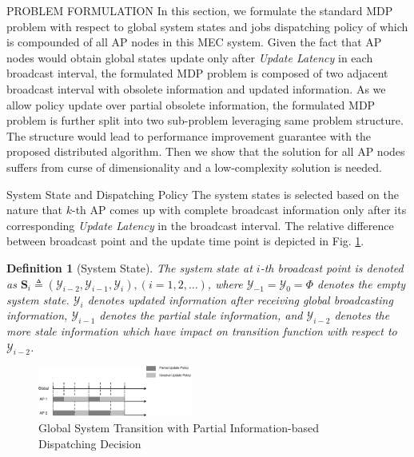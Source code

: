 \documentclass[10pt, conference, letterpaper]{IEEEtran}
\newtheorem{definition}{Definition}
\newcommand{\define}{\triangleq}
\newcommand{\Stat}{\mathbf{S}}
\newcommand{\Obsv}{\mathcal{Y}}
\begin{document}
    \begin{section}{PROBLEM FORMULATION}
        \label{sec:formulation}
        In this section, we formulate the standard MDP problem with respect to global system states and jobs dispatching policy of which is compounded of all AP nodes in this MEC system.
        Given the fact that AP nodes would obtain global states update only after \emph{Update Latency} in each broadcast interval, the formulated MDP problem is composed of two adjacent broadcast interval with obsolete information and updated information.
        As we allow policy update over partial obsolete information, the formulated MDP problem is further split into two sub-problem leveraging same problem structure. The structure would lead to performance improvement guarantee with the proposed distributed algorithm.
        Then we show that the solution for all AP nodes suffers from curse of dimensionality and a low-complexity solution is needed.

        \begin{subsection}{System State and Dispatching Policy}
            The system states is selected based on the nature that $k$-th AP comes up with complete broadcast information only after its corresponding \emph{Update Latency} in the broadcast interval.
            The relative difference between broadcast point and the update time point is depicted in Fig. \ref{fig:brd-trans}.
            \begin{definition}[System State]
                The system state at $i$-th broadcast point is denoted as $\Stat_i \define (\Obsv_{i-2}, \Obsv_{i-1}, \Obsv_{i}), (i=1,2,\dots)$, where $\Obsv_{-1}=\Obsv_{0} =\Phi$ denotes the empty system state.
                $\Obsv_{i}$ denotes updated information after receiving global broadcasting information, $\Obsv_{i-1}$ denotes the partial stale information, and $\Obsv_{i-2}$ denotes the more stale information which have impact on transition function with respect to $\Obsv_{i-2}$.
            \end{definition}

            \begin{figure}[ht]
                \centering
                \includegraphics[width=0.45\textwidth]{brd-trans.pdf}
                \caption{Global System Transition with Partial Information-based Dispatching Decision}
                \label{fig:brd-trans}
            \end{figure}


\end{subsection}
\end{section}
\end{document}
